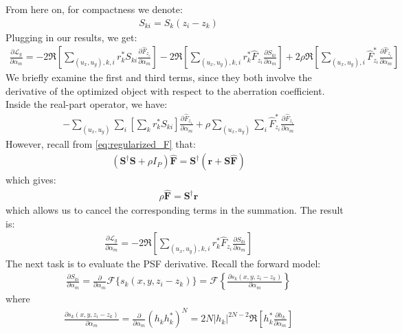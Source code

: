 \documentclass{article}
\begin{document}
From here on, for compactness we denote:
\begin{align}
S_{ki} = S_k(z_i - z_k)
\end{align}
Plugging in our results, we get:
\begin{align}
\frac{\partial \mathcal{L}_g}{\partial \alpha_m} = -2 \Re \left[\sum_{(u_x, u_y), k, i} r_k^* S_{ki} \frac{\partial \hat{F}_{z_i}}{\partial \alpha_m}\right] - 2 \Re \left[ \sum_{(u_x, u_y), k, i} r_k^* \hat{F}_{z_i} \frac{\partial S_{ki}}{\partial \alpha_m} \right] + 2 \rho \Re \left[\sum_{(u_x, u_y), i} \hat{F}^*_{z_i} \frac{\partial \hat{F}_{z_i}}{\partial \alpha_m}\right]
\end{align}
We briefly examine the first and third terms, since they both involve the derivative of the optimized object with respect to the aberration coefficient. Inside the real-part operator, we have:
\begin{align}
-\sum_{(u_x, u_y)} \sum_i \left[\sum_k r_k^* S_{ki} \right] \frac{\partial \hat{F}_{z_i}}{\partial \alpha_m} + \rho \sum_{(u_x, u_y)} \sum_i \hat{F}^*_{z_i} \frac{\partial \hat{F}_{z_i}}{\partial \alpha_m}
\end{align}
However, recall from \autoref{eq:regularized_F} that:
\begin{align}
(\mathbf{S}^\dagger \mathbf{S} + \rho I_P) \hat{\mathbf{F}} = \mathbf{S}^\dagger (\mathbf{r} + \mathbf{S} \hat{\mathbf{F}})
\end{align}
which gives:
\begin{align}
\rho \hat{\mathbf{F}} = \mathbf{S}^\dagger \mathbf{r}
\end{align}
which allows us to cancel the corresponding terms in the summation. The result is:
\begin{align}
\frac{\partial \mathcal{L}_g}{\partial \alpha_m} = - 2 \Re \left[ \sum_{(u_x, u_y), k, i} r_k^* \hat{F}_{z_i} \frac{\partial S_{ki}}{\partial \alpha_m} \right]
\end{align}
The next task is to evaluate the PSF derivative. Recall the forward model:
\begin{align}
\frac{\partial S_{ki}}{\partial \alpha_m} = \frac{\partial}{\partial \alpha_m} \mathcal{F} \{s_k(x, y, z_i - z_k) \} = \mathcal{F} \left\{ \frac{\partial s_k(x, y, z_i - z_k)}{\partial \alpha_m} \right\}
\end{align}
where
\begin{align}
\frac{\partial s_k(x, y, z_i - z_k)}{\partial \alpha_m} = \frac{\partial}{\partial \alpha_m} (h_k h_k^*)^N = 2 N|h_k|^{2N-2} \Re \left[h_k^* \frac{\partial h_k}{\partial \alpha_m} \right]
\end{align}
\end{document}
